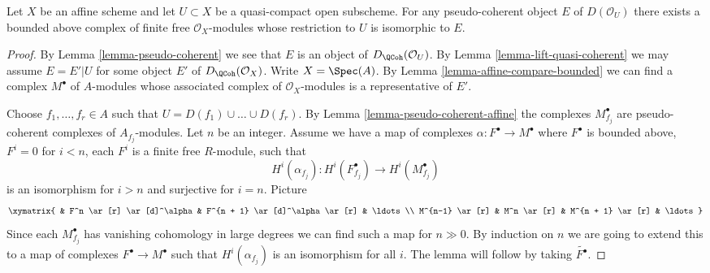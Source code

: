 \begin{lemma}
\label{lemma-lift-pseudo-coherent}
Let $X$ be an affine scheme and let $U \subset X$ be a quasi-compact
open subscheme. For any pseudo-coherent object $E$ of $D(\mathcal{O}_U)$
there exists a bounded above complex of finite free $\mathcal{O}_X$-modules 
whose restriction to $U$ is isomorphic to $E$.
\end{lemma}

\begin{proof}
By Lemma \ref{lemma-pseudo-coherent} we see that $E$ is an object of
$D_\QCoh(\mathcal{O}_U)$. By
Lemma \ref{lemma-lift-quasi-coherent}
we may assume $E = E'|U$ for some object $E'$ of
$D_\QCoh(\mathcal{O}_X)$.
Write $X = \Spec(A)$. By Lemma \ref{lemma-affine-compare-bounded}
we can find a complex $M^\bullet$ of $A$-modules whose associated
complex of $\mathcal{O}_X$-modules is a representative of $E'$.

\medskip\noindent
Choose $f_1, \ldots, f_r \in A$ such that $U = D(f_1) \cup \ldots \cup D(f_r)$.
By Lemma \ref{lemma-pseudo-coherent-affine} the complexes
$M^\bullet_{f_j}$ are pseudo-coherent complexes of $A_{f_j}$-modules.
Let $n$ be an integer. Assume we have a map of complexes
$\alpha : F^\bullet \to M^\bullet$ where $F^\bullet$ is
bounded above, $F^i = 0$ for $i < n$, each $F^i$ is a finite free
$R$-module, such that
$$
H^i(\alpha_{f_j}) : H^i(F^\bullet_{f_j}) \to H^i(M^\bullet_{f_j})
$$
is an isomorphism for $i > n$ and surjective for $i = n$. Picture
$$
\xymatrix{
& F^n \ar[r] \ar[d]^\alpha & F^{n + 1} \ar[d]^\alpha \ar[r] & \ldots \\
M^{n-1} \ar[r] & M^n \ar[r] & M^{n + 1} \ar[r] & \ldots
}
$$
Since each $M^\bullet_{f_j}$ has vanishing cohomology
in large degrees we can find such a map for $n \gg 0$.
By induction on $n$ we are going to extend this to a map
of complexes $F^\bullet \to M^\bullet$
such that $H^i(\alpha_{f_j})$ is an isomorphism
for all $i$. The lemma will follow by taking $\widetilde{F^\bullet}$.


\end{proof}
